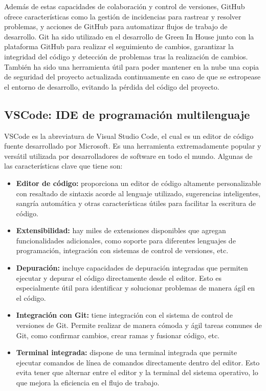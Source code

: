         Además de estas capacidades de colaboración y control de versiones, GitHub ofrece características como la gestión de incidencias para rastrear y resolver problemas, y acciones de GitHub para automatizar flujos de trabajo de desarrollo.
            Git ha sido utilizado en el desarrollo de Green In House junto con la plataforma GitHub para realizar el seguimiento de cambios, garantizar la integridad del código y detección de problemas tras la realización de cambios. También ha sido una herramienta útil para poder mantener en la nube una copia de seguridad del proyecto actualizada continuamente en caso de que se estropease el entorno de desarrollo, evitando la pérdida del código del proyecto.

    \subsection{VSCode: IDE de programación multilenguaje}
    VSCode \cite{wiki:vscode} es la abreviatura de Visual Studio Code, el cual es un editor de código fuente desarrollado por Microsoft. Es una herramienta extremadamente popular y versátil utilizada por desarrolladores de software en todo el mundo. Algunas de las características clave que tiene son:   
    \begin{itemize}
        \item \textbf{Editor de código:} proporciona un editor de código altamente personalizable con resaltado de sintaxis acorde al lenguaje utilizado, sugerencias inteligentes, sangría automática y otras características útiles para facilitar la escritura de código.        
        \item \textbf{Extensibilidad:} hay miles de extensiones disponibles que agregan funcionalidades adicionales, como soporte para diferentes lenguajes de programación, integración con sistemas de control de versiones, etc.        
        \item \textbf{Depuración:} incluye capacidades de depuración integradas que permiten ejecutar y depurar el código directamente desde el editor. Esto es especialmente útil para identificar y solucionar problemas de manera ágil en el código.        
        \item \textbf{Integración con Git:} tiene integración con el sistema de control de versiones de Git. Permite realizar de manera cómoda y ágil tareas comunes de Git, como confirmar cambios, crear ramas y fusionar código, etc.
        \item \textbf{Terminal integrada:} dispone de una terminal integrada que permite ejecutar comandos de línea de comandos directamente dentro del editor. Esto evita tener que alternar entre el editor y la terminal del sistema operativo, lo que mejora la eficiencia en el flujo de trabajo.
    \end{itemize}
    
